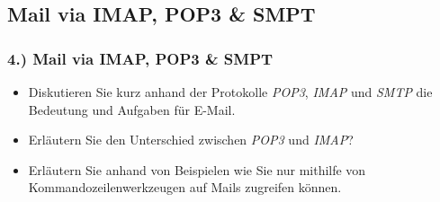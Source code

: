 \documentclass[xcolor=dvipsnames, aspectratio=169]{beamer}
\begin{document}
\subsection{Mail via IMAP, POP3 \& SMPT}
\begin{frame}
\frametitle{4.) Mail via IMAP, POP3 \& SMPT}
	\begin{itemize}
		\item Diskutieren Sie kurz anhand der Protokolle \emph{POP3}, \emph{IMAP} und \emph{SMTP} die Bedeutung und Aufgaben für E-Mail. 
		\item Erläutern Sie den Unterschied zwischen \emph{POP3} und \emph{IMAP}?
		\item Erläutern Sie anhand von Beispielen wie Sie nur mithilfe von Kommandozeilenwerkzeugen auf Mails zugreifen können.
	\end{itemize}
\end{frame}
\end{document}
